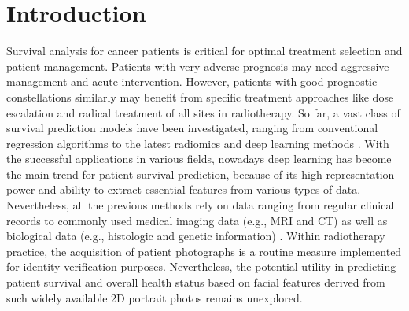 \documentclass[runningheads]{llncs}
\begin{document}
\section{Introduction}
Survival analysis for cancer patients is critical for optimal treatment selection and patient management. Patients with very adverse prognosis may need aggressive management and acute intervention. %
However, patients with good prognostic constellations similarly may benefit from specific treatment approaches like dose escalation and radical treatment of all sites in radiotherapy. So far, a vast class of survival prediction models have been investigated, ranging from conventional regression algorithms \cite{emura2012survival,kidd2018survival} to the latest radiomics \cite{van2017survival,chen2022mri} and deep learning methods \cite{wang2021cox,katzman2018deepsurv,kim2019deep,wankhede2022dynamic}.
With the successful applications in various fields, nowadays deep learning has become the main trend for patient survival prediction, because of its high representation power and ability to extract essential features from various types of data. 
Nevertheless, all the previous methods rely on data ranging from regular clinical records to commonly used medical imaging data (e.g., MRI and CT) as well as biological data (e.g., histologic and genetic information) \cite{vale2021long}. 
Within radiotherapy practice, the acquisition of patient photographs is a routine measure implemented for identity verification purposes.
Nevertheless, the potential utility in predicting patient survival and overall health status based on facial features derived from such widely available 2D portrait photos remains unexplored.
\end{document}
